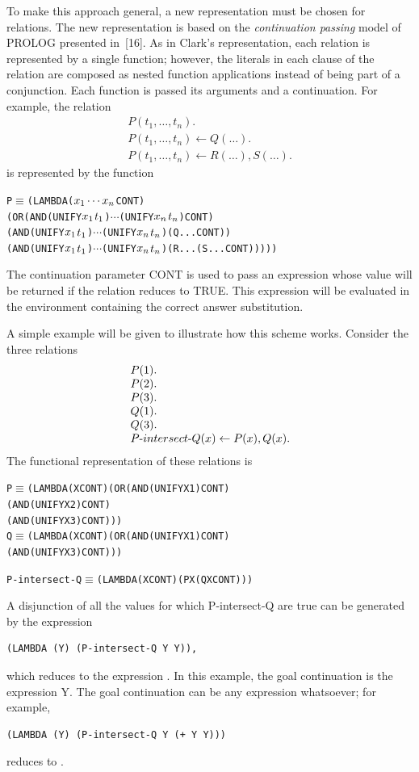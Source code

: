 To make this approach general, a new representation must be chosen for
relations. The new representation is based on the \emph{continuation passing} model of
PROLOG presented in~[16]. As in Clark's representation, each relation is
represented by a single function; however, the literals in each clause of the
relation are composed as nested function applications instead of being part of a
conjunction. Each function is passed its arguments and a continuation. For
example, the relation
\[
\begin{array}{l}
P(t_1,\ldots,t_n).\\
P(t_1,\ldots,t_n)\leftarrow Q(\ldots).\\
P(t_1,\ldots,t_n)\leftarrow R(\ldots),S(\ldots).
\end{array}
\]
is represented by the function
\begin{alltt}
P \(\equiv\) (LAMBDA (\(x\sb{1} \cdots x\sb{n}\) CONT)
      (OR (AND (UNIFY \(x\sb{1}\) \(t\sb{1}\)) \(\cdots\) (UNIFY \(x\sb{n}\) \(t\sb{n}\)) CONT)
          (AND (UNIFY \(x\sb{1}\) \(t\sb{1}\)) \(\cdots\) (UNIFY \(x\sb{n}\) \(t\sb{n}\)) (Q ... CONT))
          (AND (UNIFY \(x\sb{1}\) \(t\sb{1}\)) \(\cdots\) (UNIFY \(x\sb{n}\) \(t\sb{n}\)) (R ... (S ... CONT)))))
\end{alltt}
The continuation parameter CONT is used to pass an expression whose value will
be returned if the relation reduces to TRUE. This expression will be evaluated
in the environment containing the correct answer substitution.

A simple example will be given to illustrate how this scheme works. Consider the
three relations
\[
\begin{array}{l}
P(1).\\
P(2).\\
P(3).\\
Q(1).\\
Q(3).\\
P\hbox{-}intersect\hbox{-}Q(x)\leftarrow P(x),Q(x).
\end{array}
\]
The functional representation of these relations is
\begin{alltt}
P \(\equiv\) (LAMBDA (X CONT) (OR (AND (UNIFY X 1) CONT)
                         (AND (UNIFY X 2) CONT)
                         (AND (UNIFY X 3) CONT)))
Q \(\equiv\) (LAMBDA (X CONT) (OR (AND (UNIFY X 1) CONT)
                         (AND (UNIFY X 3) CONT)))

P-intersect-Q \(\equiv\) (LAMBDA (X CONT) (P X (Q X CONT)))
\end{alltt}
A disjunction of all the values for which P-intersect-Q are true can be
generated by the expression
\begin{verbatim}
(LAMBDA (Y) (P-intersect-Q Y Y)),
\end{verbatim}
which reduces to the expression . In this example, the goal
continuation is the expression Y. The goal continuation can be any expression
whatsoever; for example,
\begin{verbatim}
(LAMBDA (Y) (P-intersect-Q Y (+ Y Y)))
\end{verbatim}
reduces to .

